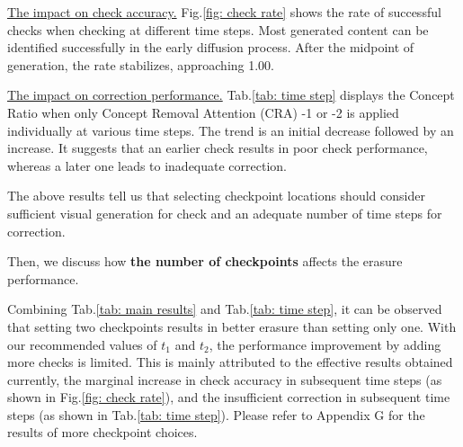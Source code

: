 \underline{The impact on check accuracy.} Fig.\ref{fig: check rate} shows the rate of successful checks when checking at different time steps. Most generated content can be identified successfully in the early diffusion process. After the midpoint of generation, the rate stabilizes, approaching 1.00.

\underline{The impact on correction performance.} Tab.\ref{tab: time step} displays the Concept Ratio when only Concept Removal Attention (CRA) -1 or -2 is applied individually at various time steps. The trend is an initial decrease followed by an increase. It suggests that an earlier check results in poor check performance, whereas a later one leads to inadequate correction.

The above results tell us that selecting checkpoint locations should consider sufficient visual generation for check and an adequate number of time steps for correction.

Then, we discuss how \textbf{the number of checkpoints} affects the erasure performance. 

Combining Tab.\ref{tab: main results} and Tab.\ref{tab: time step}, it can be observed that setting two checkpoints results in better erasure than setting only one. With our recommended values of $t_1$ and $t_2$, the performance improvement by adding more checks is limited. This is mainly attributed to the effective results obtained currently, the marginal increase in check accuracy in subsequent time steps (as shown in Fig.\ref{fig: check rate}), and the insufficient correction in subsequent time steps (as shown in Tab.\ref{tab: time step}). Please refer to Appendix G for the results of more checkpoint choices.


